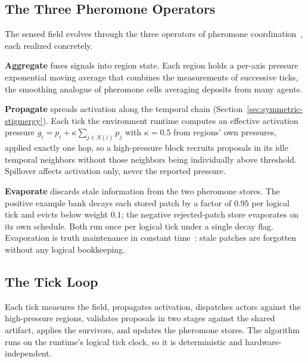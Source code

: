 \subsection{The Three Pheromone Operators}

The sensed field evolves through the three operators of pheromone coordination~\cite{parunak2011mean}, each realized concretely.

\textbf{Aggregate} fuses signals into region state. Each region holds a per-axis pressure exponential moving average that combines the measurements of successive ticks, the smoothing analogue of pheromone cells averaging deposits from many agents.

\textbf{Propagate} spreads activation along the temporal chain (Section~\ref{sec:symmetric-stigmergy}). Each tick the environment runtime computes an effective activation pressure $g_i = p_i + \kappa \sum_{j \in N(i)} p_j$ with $\kappa = 0.5$ from regions' own pressures, applied exactly one hop, so a high-pressure block recruits proposals in its idle temporal neighbors without those neighbors being individually above threshold. Spillover affects activation only, never the reported pressure.

\textbf{Evaporate} discards stale information from the two pheromone stores. The positive example bank decays each stored patch by a factor of $0.95$ per logical tick and evicts below weight $0.1$; the negative rejected-patch store evaporates on its own schedule. Both run once per logical tick under a single decay flag. Evaporation is truth maintenance in constant time~\cite{parunak2011mean}: stale patches are forgotten without any logical bookkeeping.

\subsection{The Tick Loop}

Each tick measures the field, propagates activation, dispatches actors against the high-pressure regions, validates proposals in two stages against the shared artifact, applies the survivors, and updates the pheromone stores. The algorithm runs on the runtime's logical tick clock, so it is deterministic and hardware-independent.

